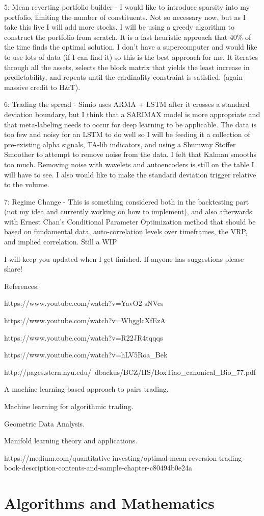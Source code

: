 \documentclass[11pt]{article}
\begin{document}
5: Mean reverting portfolio builder - I would like to introduce sparsity into my portfolio, limiting the number of constituents. Not so necessary now, but as I take this live I will add more stocks. I will be using a greedy algorithm to construct the portfolio from scratch. It is a fast heuristic approach that 40\% of the time finds the optimal solution. I don't have a supercomputer and would like to use lots of data (if I can find it) so this is the best approach for me. It iterates through all the assets, selects the block matrix that yields the least increase in predictability, and repeats until the cardinality constraint is satisfied. (again massive credit to H\&T).

6: Trading the spread - Simio uses ARMA + LSTM after it crosses a standard deviation boundary, but I think that a SARIMAX model is more appropriate and that meta-labeling needs to occur for deep learning to be applicable. The data is too few and noisy for an LSTM to do well so I will be feeding it a collection of pre-existing alpha signals, TA-lib indicators, and using a Shumway Stoffer Smoother to attempt to remove noise from the data. I felt that Kalman smooths too much. Removing noise with wavelets and autoencoders is still on the table I will have to see. I also would like to make the standard deviation trigger relative to the volume.

7: Regime Change - This is something considered both in the backtesting part (not my idea and currently working on how to implement), and also afterwards with Ernest Chan's Conditional Parameter Optimization method that should be based on fundamental data, auto-correlation levels over timeframes, the VRP, and implied correlation. Still a WIP

I will keep you updated when I get finished. If anyone has suggestions please share!

References:

https://www.youtube.com/watch?v=YavO2-sNVcs

https://www.youtube.com/watch?v=WbgglcXfEzA

https://www.youtube.com/watch?v=R22JR4tqqqs

https://www.youtube.com/watch?v=hLV5Roa_Bek

http://pages.stern.nyu.edu/~dbackus/BCZ/HS/BoxTiao_canonical_Bio_77.pdf

A machine learning-based approach to pairs trading.

Machine learning for algorithmic trading.

Geometric Data Analysis.

Manifold learning theory and applications.

https://medium.com/quantitative-investing/optimal-mean-reversion-trading-book-description-contents-and-sample-chapter-c80494b0e24a

\section{Algorithms and Mathematics}
\end{document}
